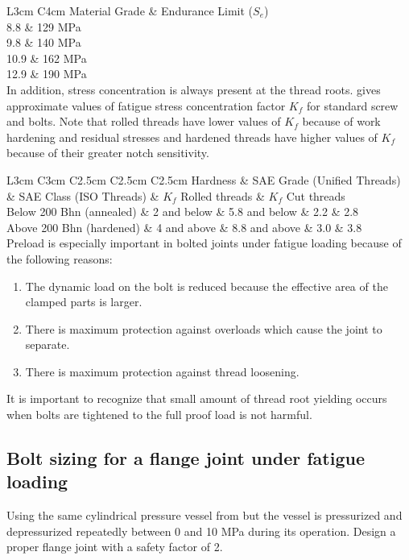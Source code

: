 \documentclass[a4paper,openany,12pt]{book}
\begin{document}
{{ L3cm C4cm Material Grade \& Endurance Limit (\(S_e\))\\
8.8 \& 129 MPa\\
9.8 \& 140 MPa\\
10.9 \& 162 MPa\\
12.9 \& 190 MPa\\

In addition, stress concentration is always present at the thread roots.
gives approximate values of fatigue stress concentration factor \(K_f\)
for standard screw and bolts. Note that rolled threads have lower values
of \(K_f\) because of work hardening and residual stresses and hardened
threads have higher values of \(K_f\) because of their greater notch
sensitivity.

 L3cm C3cm C2.5cm C2.5cm C2.5cm Hardness \& SAE Grade (Unified Threads) \&
SAE Class (ISO Threads) \& \(K_f\) Rolled threads \& \(K_f\) Cut threads\\
Below 200 Bhn (annealed) \& 2 and below \& 5.8 and below \& 2.2 \& 2.8\\
Above 200 Bhn (hardened) \& 4 and above \& 8.8 and above \& 3.0 \& 3.8\\

Preload is especially important in bolted joints under fatigue loading
because of the following reasons:

\begin{enumerate}
\item The dynamic load on the bolt is reduced because the effective area of
the clamped parts is larger.

\item There is maximum protection against overloads which cause the joint
to separate.

\item There is maximum protection against thread loosening.
\end{enumerate}

It is important to recognize that small amount of thread root yielding
occurs when bolts are tightened to the full proof load is not harmful.

\subsection{Bolt sizing for a flange joint under fatigue loading}
\label{sec:org0ee41ea}

Using the same cylindrical pressure vessel from
but the vessel is pressurized and depressurized repeatedly between 0 and
10 MPa during its operation. Design a proper flange joint with a safety
factor of 2.

}}
\end{document}
